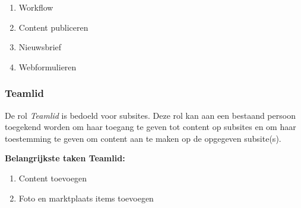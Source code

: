 \begin{enumerate}
\item Workflow
\item Content publiceren
\item Nieuwsbrief
\item Webformulieren
\end{enumerate}

\subsubsection{Teamlid}\label{teamlid}
De rol \emph{Teamlid} is bedoeld voor subsites. Deze rol kan aan een bestaand persoon toegekend worden om haar toegang te geven tot content op subsites en om haar toestemming te geven om content aan te maken op de opgegeven subsite(s).

\textbf{Belangrijkste taken Teamlid:}

\begin{enumerate}
\item Content toevoegen
\item Foto en marktplaats  items toevoegen
\end{enumerate}